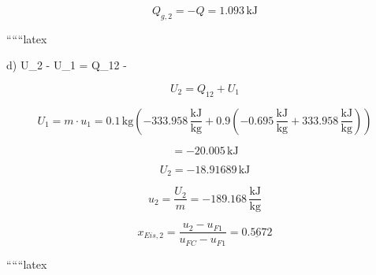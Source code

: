 \[
Q_{g,2} = -Q = 1.093 \, \text{kJ}
\]

``````latex


d) \quad U_2 - U_1 = Q_{12} -  \quad {}

\[
U_2 = Q_{12} + U_1
\]

\[
U_1 = m \cdot u_1 = 0.1 \, \text{kg} \left( -333.958 \, \frac{\text{kJ}}{\text{kg}} + 0.9 \left( -0.695 \, \frac{\text{kJ}}{\text{kg}} + 333.958 \, \frac{\text{kJ}}{\text{kg}} \right) \right)
\]

\[
= -20.005 \, \text{kJ}
\]

\[
U_2 = -18.91689 \, \text{kJ}
\]

\[
u_2 = \frac{U_2}{m} = -189.168 \, \frac{\text{kJ}}{\text{kg}}
\]

\[
x_{Eis,2} = \frac{u_2 - u_{F1}}{u_{FC} - u_{F1}} = \underline{0.5672}
\]

``````latex


